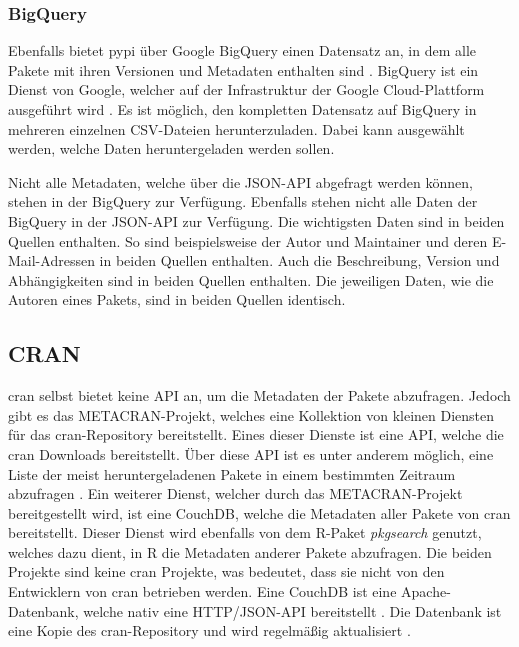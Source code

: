 \subsubsection*{BigQuery}
\label{subsubsec:pypi_bigquery}
Ebenfalls bietet \gls{pypi} über Google BigQuery einen Datensatz an, in dem alle Pakete mit ihren Versionen und Metadaten enthalten sind \autocite{python_software_foundation_warehouse_2024}.
BigQuery ist ein Dienst von Google, welcher auf der Infrastruktur der Google Cloud-Plattform ausgeführt wird \autocite{google_bigquery_2024}.
Es ist möglich, den kompletten Datensatz auf BigQuery in mehreren einzelnen CSV-Dateien herunterzuladen.
Dabei kann ausgewählt werden, welche Daten heruntergeladen werden sollen.

Nicht alle Metadaten, welche über die JSON-API abgefragt werden können, stehen in der BigQuery zur Verfügung.
Ebenfalls stehen nicht alle Daten der BigQuery in der JSON-API zur Verfügung.
Die wichtigsten Daten sind in beiden Quellen enthalten.
So sind beispielsweise der Autor und Maintainer und deren E-Mail-Adressen in beiden Quellen enthalten.
Auch die Beschreibung, Version und Abhängigkeiten sind in beiden Quellen enthalten.
Die jeweiligen Daten, wie die Autoren eines Pakets, sind in beiden Quellen identisch.

\subsection{CRAN}
\label{subsec:paketverwaltung_cran}
\gls{cran} selbst bietet keine API an, um die Metadaten der Pakete abzufragen.
Jedoch gibt es das METACRAN-Projekt, welches eine Kollektion von kleinen Diensten für das \gls{cran}-Repository bereitstellt.
Eines dieser Dienste ist eine API, welche die \gls{cran} Downloads bereitstellt.
Über diese API ist es unter anderem möglich, eine Liste der meist heruntergeladenen Pakete in einem bestimmten Zeitraum abzufragen \autocite{csardi_r-hubcranlogsapp_2024}.
Ein weiterer Dienst, welcher durch das METACRAN-Projekt bereitgestellt wird, ist eine CouchDB, welche die Metadaten aller Pakete von \gls{cran} bereitstellt.
Dieser Dienst wird ebenfalls von dem R-Paket \emph{pkgsearch} genutzt, welches dazu dient, in R die Metadaten anderer Pakete abzufragen.
Die beiden Projekte sind keine \gls{cran} Projekte, was bedeutet, dass sie nicht von den Entwicklern von \gls{cran} betrieben werden.
Eine CouchDB ist eine Apache-Datenbank, welche nativ eine HTTP/JSON-API bereitstellt \autocite{the_apache_software_foundation_apache_2024}.
Die Datenbank ist eine Kopie des \gls{cran}-Repository und wird regelmäßig aktualisiert \autocite{csardi_pkgsearch_2023}.


